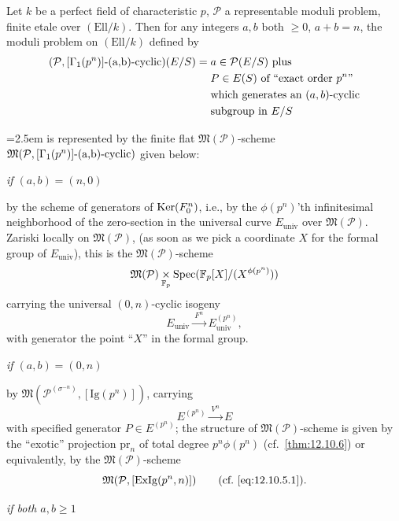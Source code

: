 \begin{kcor}\label{cor:13.5.3}
Let $k$ be a perfect field of characteristic $p$, $\mathcal{P}$ a representable moduli problem, finite etale over $(\mathrm{Ell}/k)$. Then for any integers $a, b$ both $\ge 0$, $a + b = n$, the moduli problem on $(\mathrm{Ell}/k)$ defined by
\[
\begin{aligned}
(\mathcal{P}, [\Gamma_1(p^n)]\text{-\rm (a,b)-cyclic})(E/S) = {}& a \in \mathcal{P}(E/S) \text{ plus} \\
& P \in E(S) \text{ of ``exact order } p^n\text{''} \\
& \text{which generates an } (a,b)\text{-cyclic} \\
& \text{subgroup in } E/S
\end{aligned}
\]
{\emergencystretch=2.5em
is represented by the finite flat $\mathfrak{M}(\mathcal{P})$-scheme $\mathfrak{M}(\mathcal{P}, [\Gamma_1(p^n)]\text{-\rm (a,b)-}\allowbreak\text{cyclic})$ given below:\par}

\smallskip
\noindent\emph{if $(a,b) = (n,0)$}

by the scheme of generators of $\operatorname{Ker}(F_0^n)$, i.e., by the $\phi(p^n)$'th infinitesimal neighborhood of the zero-section in the universal curve $E_{\mathrm{univ}}$ over $\mathfrak{M}(\mathcal{P})$. Zariski locally on $\mathfrak{M}(\mathcal{P})$, (as soon as we pick a coordinate $X$ for the formal group of $E_{\mathrm{univ}}$), this is the $\mathfrak{M}(\mathcal{P})$-scheme
\[
\mathfrak{M}(\mathcal{P}) \underset{\mathbb{F}_p}{\times} \operatorname{Spec}(\mathbb{F}_p[X]/(X^{\phi(p^n)}))
\]
carrying the universal $(0,n)$-cyclic isogeny
\[
E_{\mathrm{univ}} \xrightarrow{\ F^n\ } E_{\mathrm{univ}}^{(p^n)} ,
\]
with generator the point ``$X$'' in the formal group.

\smallskip
\noindent\emph{if $(a,b) = (0,n)$}

by $\mathfrak{M}(\mathcal{P}^{(\sigma^{-n})}, [\mathrm{Ig}(p^n)])$, carrying
\[
E^{(p^n)} \xrightarrow{\ V^n\ } E
\]
with specified generator $P \in E^{(p^n)}$; the structure of $\mathfrak{M}(\mathcal{P})$-scheme is given by the ``exotic'' projection $\mathrm{pr}_n$ of total degree $p^n \phi(p^n)$ (cf.~\ref{thm:12.10.6}) or equivalently, by the $\mathfrak{M}(\mathcal{P})$-scheme
\[
\mathfrak{M}(\mathcal{P}, [\mathrm{ExIg}(p^n, n)]) \qquad (\text{cf.~\ref{eq:12.10.5.1}}) .
\]

\smallskip
\noindent\emph{if both $a, b \ge 1$}


\end{kcor}
